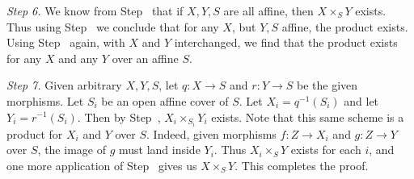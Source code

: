 {\hypertarget{proof-II-3.3-step-6}{}\emph{Step 6.} We know from Step~ that if $X,Y,S$ are all affine, then $X\times_S Y$ exists. Thus using Step~ we conclude that for any $X$, but $Y,S$ affine, the product exists. Using Step~ again, with $X$ and $Y$ interchanged, we find that the product exists for any $X$ and any $Y$ over an affine $S$.

\hypertarget{proof-II-3.3-step-7}{}\emph{Step 7.} Given arbitrary $X,Y,S$, let $q\colon X\to S$ and $r\colon Y\to S$ be the given morphisms. Let $S_i$ be an open affine cover of $S$. Let $X_i=q^{-1}(S_i)$ and let $Y_i=r^{-1}(S_i)$. Then by Step~, $X_i\times_{S_i}Y_i$ exists. Note that this same scheme is a product for $X_i$ and $Y$ over $S$. Indeed, given morphisms $f\colon Z\to X_i$ and $g\colon Z\to Y$ over $S$, the image of $g$ must land inside $Y_i$. Thus $X_i\times_S Y$ exists for each $i$, and one more application of Step~ gives us $X\times_S Y$. This completes the proof.}
